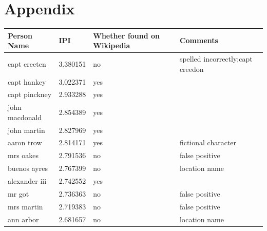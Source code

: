 \documentclass[letterpaper,11pt]{report}
\begin{document}
%

%
%


\chapter*{Appendix}\label{chapter:appendix} 

\begin{table}[!h]
\centering
\begin{tabular}{|l|l|p{3cm}|p{3cm}|}
\hline
\textbf{Person Name}      & \textbf{IPI}      & \textbf{Whether found on Wikipedia} & \textbf{Comments}                                     \\ \hline
capt creeten     & 3.380151 & no                 & spelled incorrectly;capt creedon \\ \hline
capt hankey      & 3.022371 & yes                &                                      \\ \hline
capt pinckney    & 2.933288 & yes                &                                      \\ \hline
john macdonald   & 2.854389 & yes                &                                      \\ \hline
john martin      & 2.827969 & yes                &                                      \\ \hline
aaron trow       & 2.814171 & yes                & fictional character                  \\ \hline
mrs oakes        & 2.791536 & no                 & false positive                       \\ \hline
buenos ayres     & 2.767399 & no                 & location name                            \\ \hline
alexander iii    & 2.742552 & yes                &                                      \\ \hline
mr got           & 2.736363 & no                 & false positive                       \\ \hline
mrs martin       & 2.719383 & no                 & false positive                       \\ \hline
ann arbor        & 2.681657 & no                 & location name                            \\ \hline

\end{tabular}
\end{table}
\end{document}
